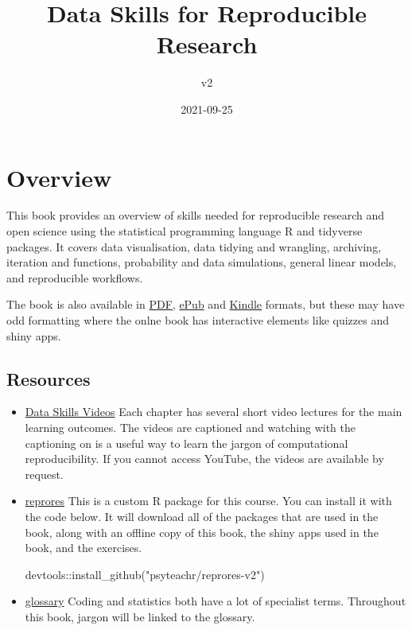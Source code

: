 \documentclass[
  oneside]{book}
\title{Data Skills for Reproducible Research}
\subtitle{v2}
\author{}
\date{\vspace{-2.5em}2021-09-25}
\newenvironment{Shaded}{\begin{snugshade}}{\end{snugshade}}
\newcommand{\FunctionTok}[1]{\textcolor[rgb]{0.00,0.00,0.00}{#1}}
\newcommand{\NormalTok}[1]{#1}
\newcommand{\SpecialCharTok}[1]{\textcolor[rgb]{0.00,0.00,0.00}{#1}}
\newcommand{\StringTok}[1]{\textcolor[rgb]{0.31,0.60,0.02}{#1}}
\begin{document}
\maketitle

{
\setcounter{tocdepth}{1}
\tableofcontents
}
\hypertarget{overview}{%
\chapter*{Overview}\label{overview}}

This book provides an overview of skills needed for reproducible research and open science using the statistical programming language R and tidyverse packages. It covers data visualisation, data tidying and wrangling, archiving, iteration and functions, probability and data simulations, general linear models, and reproducible workflows.

The book is also available in \href{reprores-v2.pdf}{PDF}, \href{reprores-v2.epub}{ePub} and \href{reprores-v2.mobi}{Kindle} formats, but these may have odd formatting where the onlne book has interactive elements like quizzes and shiny apps.

\hypertarget{resources}{%
\section*{Resources}\label{resources}}

\begin{itemize}
\item
  \href{https://www.youtube.com/playlist?list=PLA2iRWVwbpTKqULIFGBIe4Bg-YounTV1J}{Data Skills Videos}
  Each chapter has several short video lectures for the main learning outcomes. The videos are captioned and watching with the captioning on is a useful way to learn the jargon of computational reproducibility. If you cannot access YouTube, the videos are available by request.
\item
  \href{https://github.com/psyteachr/reprores-v2}{reprores}
  This is a custom R package for this course. You can install it with the code below. It will download all of the packages that are used in the book, along with an offline copy of this book, the shiny apps used in the book, and the exercises.

\begin{Shaded}
\begin{Highlighting}[]
\NormalTok{devtools}\SpecialCharTok{::}\FunctionTok{install\_github}\NormalTok{(}\StringTok{"psyteachr/reprores{-}v2"}\NormalTok{)}
\end{Highlighting}
\end{Shaded}
\item
  \href{https://psyteachr.github.io/glossary}{glossary}
  Coding and statistics both have a lot of specialist terms. Throughout this book, jargon will be linked to the glossary.
\end{itemize}
\end{document}
